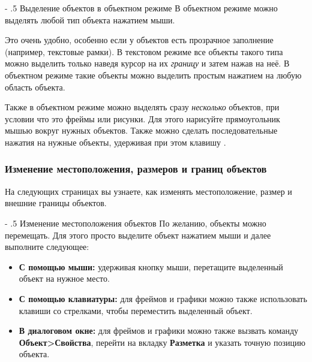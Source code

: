 \documentclass[a4paper,10pt]{article}
\makeatletter
\renewcommand\paragraph{%
   \@startsection{paragraph}{4}{0mm}%
      {-\baselineskip}%
      {.5\baselineskip}%
      {\normalfont\normalsize\bfseries}}
\makeatother
\begin{document}
\paragraph{Выделение объектов в объектном режиме}
В объектном режиме можно выделять любой тип объекта нажатием мыши.

Это очень удобно, особенно если у объектов есть прозрачное заполнение (например, текстовые рамки). В текстовом режиме все объекты такого типа можно выделить только наведя курсор на их \textit{границу} и затем нажав на неё. В объектном режиме такие объекты можно выделить простым нажатием на любую область объекта.

Также в объектном режиме можно выделять сразу \textit{несколько} объектов, при условии что это фреймы или рисунки. Для этого нарисуйте прямоугольник мышью  вокруг нужных объектов. Также можно сделать последовательные нажатия на нужные объекты, удерживая при этом клавишу .

\subsubsection{Изменение местоположения, размеров и границ объектов}
На следующих страницах вы узнаете, как изменять местоположение, размер и внешние границы объектов.

\paragraph{Изменение местоположения объектов}
По желанию, объекты можно перемещать. Для этого просто выделите объект нажатием мыши и далее выполните следующее:
\begin{itemize}
 \item \textbf{С помощью мыши:} удерживая кнопку мыши, перетащите выделенный объект на нужное место.
 \item \textbf{С помощью клавиатуры:} для фреймов и графики можно также использовать клавиши со стрелками, чтобы переместить выделенный объект.
 \item \textbf{В диалоговом окне:} для фреймов и графики можно также вызвать команду \textbf{Объект>Свойства}, перейти на вкладку \textbf{Разметка} и указать точную позицию объекта.
\end{itemize}
\end{document}
